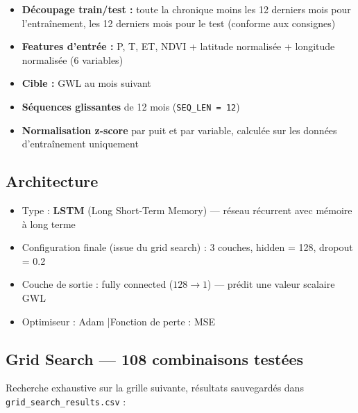 \documentclass[11pt, a4paper]{article}
\begin{document}
\begin{itemize}
  \setlength\itemsep{2pt}
  \item \textbf{Découpage train/test :} toute la chronique moins les 12 derniers mois
        pour l'entraînement, les 12 derniers mois pour le test (conforme aux consignes)
  \item \textbf{Features d'entrée :} P, T, ET, NDVI + latitude normalisée + longitude
        normalisée (6 variables)
  \item \textbf{Cible :} GWL au mois suivant
  \item \textbf{Séquences glissantes} de 12 mois (\texttt{SEQ\_LEN = 12})
  \item \textbf{Normalisation z-score} par puit et par variable, calculée sur les données
        d'entraînement uniquement
\end{itemize}

\subsection{Architecture}

\begin{itemize}
  \setlength\itemsep{2pt}
  \item Type : \textbf{LSTM} (Long Short-Term Memory) — réseau récurrent avec mémoire
        à long terme
  \item Configuration finale (issue du grid search) : 3 couches, hidden = 128,
        dropout = 0.2
  \item Couche de sortie : fully connected ($128 \to 1$) — prédit une valeur scalaire GWL
  \item Optimiseur : Adam \quad|\quad Fonction de perte : MSE
\end{itemize}

\subsection{Grid Search — 108 combinaisons testées}

Recherche exhaustive sur la grille suivante, résultats sauvegardés dans
\texttt{grid\_search\_results.csv} :
\end{document}
